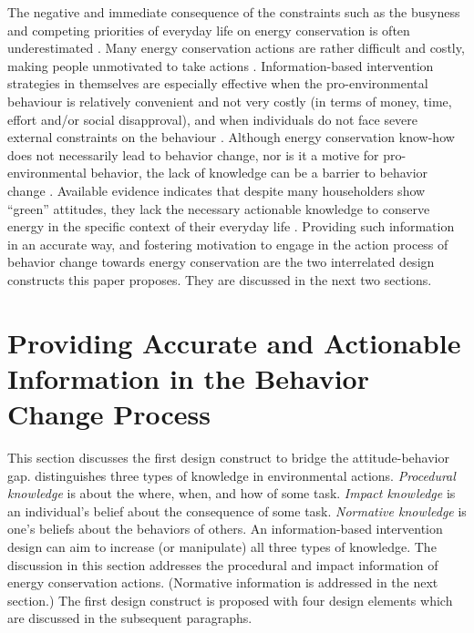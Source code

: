 \documentclass[a4paper]{article}
\begin{document}
The negative and immediate consequence of the constraints such as the busyness and competing priorities of everyday life on energy conservation is often underestimated \citep{Berthou2013,Burchell2014,Dillahunt2014,Strengers2014}. Many energy conservation actions are rather difficult and costly, making people unmotivated to take actions \citep{Fogg2009,ockwell2009reorienting,Petkov2011,corradi2013oops}. Information-based intervention strategies in themselves are especially effective when the pro-environmental behaviour is relatively convenient and not very costly (in terms of money, time, effort and/or social disapproval), and when individuals do not face severe external constraints on the behaviour \citep{Steg2009}.  Although energy conservation know-how does not necessarily lead to behavior change, nor is it a motive for pro-environmental behavior, the lack of knowledge can be a barrier to behavior change \citep{Schultz2002}. Available evidence 
indicates that despite many householders show ``green'' attitudes, they lack the necessary actionable knowledge to conserve energy in the specific context of their everyday life \citep{Gardner2008}. Providing such information in an accurate way, and fostering motivation to engage in the action process of behavior change towards energy conservation are the two interrelated design constructs this paper proposes. They are discussed in the next two sections. 

\section{Providing Accurate and Actionable Information in the Behavior Change Process}
\label{sec:information}

This section discusses the first design construct to bridge the attitude-behavior gap. \citet{Schultz2002} distinguishes three types of knowledge in environmental actions. \textit{Procedural knowledge} is about the where, when, and how of some task. \textit{Impact knowledge} is an individual's belief about the consequence of some task. \textit{Normative knowledge} is one's beliefs about the behaviors of others. An information-based intervention design can aim to increase (or manipulate) all three types of knowledge. The discussion in this section addresses the procedural and impact information of energy conservation actions. (Normative information is addressed in the next section.) The first design construct is proposed with four design elements which are discussed in the subsequent paragraphs. 
\end{document}
